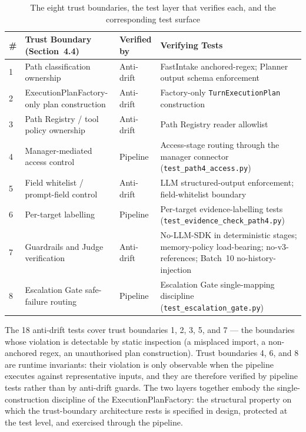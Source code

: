 \begin{table}[H]
\centering
\renewcommand{\arraystretch}{1.3}
\footnotesize
\begin{tabularx}{\textwidth}{|p{0.5cm}|p{4cm}|p{2cm}|>{\RaggedRight\arraybackslash}X|}
\hline
\rowcolor{lightgray}
\textbf{\#} & \textbf{Trust Boundary (Section~4.4)} & \textbf{Verified by} & \textbf{Verifying Tests} \\ \hline
1 & Path classification ownership & Anti-drift & FastIntake anchored-regex; Planner output schema enforcement \\ \hline
2 & ExecutionPlanFactory-only plan construction & Anti-drift & Factory-only \texttt{TurnExecutionPlan} construction \\ \hline
3 & Path Registry / tool policy ownership & Anti-drift & Path Registry reader allowlist \\ \hline
4 & Manager-mediated access control & Pipeline & Access-stage routing through the manager connector (\texttt{test\_path4\_access.py}) \\ \hline
5 & Field whitelist / prompt-field control & Anti-drift & LLM structured-output enforcement; field-whitelist boundary \\ \hline
6 & Per-target labelling & Pipeline & Per-target evidence-labelling tests (\texttt{test\_evidence\_check\_path4.py}) \\ \hline
7 & Guardrails and Judge verification & Anti-drift & No-LLM-SDK in deterministic stages; memory-policy load-bearing; no-v3-references; Batch~10 no-history-injection \\ \hline
8 & Escalation Gate safe-failure routing & Pipeline & Escalation Gate single-mapping discipline (\texttt{test\_escalation\_gate.py}) \\ \hline
\end{tabularx}
\caption{The eight trust boundaries, the test layer that verifies each, and the corresponding test surface}
\label{tab:anti_drift_mapping}
\end{table}

The 18 anti-drift tests cover trust boundaries 1, 2, 3, 5, and 7 --- the boundaries whose violation is detectable by static inspection (a misplaced import, a non-anchored regex, an unauthorised plan construction). Trust boundaries 4, 6, and 8 are runtime invariants: their violation is only observable when the pipeline executes against representative inputs, and they are therefore verified by pipeline tests rather than by anti-drift guards. The two layers together embody the single-construction discipline of the ExecutionPlanFactory: the structural property on which the trust-boundary architecture rests is specified in design, protected at the test level, and exercised through the pipeline.

